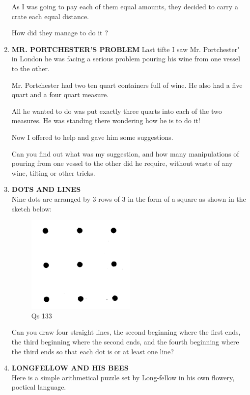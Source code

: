 \documentclass[12pt]{article}
\begin{document}
\begin{enumerate}
As I was  going  to pay  each  of them  equal  amounts, they decided  to carry  a crate  each  equal  distance. 

How  did they  manage  to do it ? 

\item \textbf{MR.  PORTCHESTER'S  PROBLEM} 
Last tifte  I saw  Mr.  Portchester"  in London  he was facing  a serious  problem  pouring  his wine  from  one vessel to the other. 

Mr. Portchester  had  two  ten  quart  containers  full of wine.  He  also  had a five  quart  and  a four  quart measure. 

All he wanted  to do was  put exactly  three  quarts  into each of the  two  measures.  He  was  standing  there wondering  how  he is to do it! 

Now  I offered  to help  and gave  him  some  suggestions. 

Can you find  out what  was  my  suggestion,  and how many  manipulations  of pouring  from  one  vessel  to the other  did he require,  without  waste  of any wine,  tilting  or other  tricks. 


\item \textbf{DOTS  AND  LINES} \\
Nine  dots  are  arranged  by 3 rows  of 3 in the form  of 
a square  as shown  in the sketch  below: 

\begin{figure}[h]
\begin{center}
\includegraphics[width=0.5\textwidth]{images/sdevi_q133.png}
\caption{ Qs 133}
\end{center}
\end{figure}

Can you  draw  four  straight  lines,  the second  beginning where  the first  ends,  the third  beginning  where  the second ends,  and the fourth  beginning  where  the  third  ends  so that each  dot is or at least  one line? 
%
%
\item \textbf{LONGFELLOW  AND  HIS  BEES} \\
Here  is a simple  arithmetical  puzzle  set  by  Long-fellow  in his own  flowery,  poetical  language. 


\end{enumerate}
\end{document}
